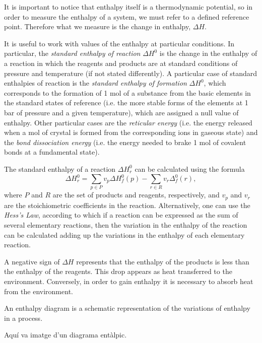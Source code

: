 \documentclass[a4paper,10pt]{article}
\theoremstyle{plain}
\theoremstyle{definition}
\theoremstyle{remark}
\begin{document}
It is important to notice that enthalpy itself is a thermodynamic potential, so in order to measure the enthalpy of a system, we must refer to a defined reference point. Therefore what we measure is the change in enthalpy, $\Delta H$.

It is useful to work with values of the enthalpy at particular conditions. In particular, the \textit{standard enthalpy of reaction} $\Delta H^0$ is the change in the enthalpy of a reaction in which the reagents and products are at standard conditions of pressure and temperature (if not stated differently). A particular case of standard enthalpies of reaction is the \textit{standard enthalpy of formation} $\Delta H^0$, which corresponds to the formation of 1 mol of a substance from the basic elements in the standard states of reference (i.e. the more stable forms of the elements at 1 bar of pressure and a given temperature), which are assigned a null value of enthalpy. Other particular cases are the \textit{reticular energy} (i.e. the energy released when a mol of crystal is formed from the corresponding ions in gaseous state) and the \textit{bond dissociation energy} (i.e. the energy needed to brake 1 mol of covalent bonds at a fundamental state).

The standard enthalpy of a reaction $\Delta H_r^0$ can be calculated using the formula
\begin{equation}
\Delta H_r^0=\sum_{p\in P}v_p\Delta H_f^0(p) - \sum_{r\in R} v_r\Delta_f^0(r),
\end{equation}
where $P$ and $R$ are the set of products and reagents, respectively, and $v_p$ and $v_r$ are the stoichiometric coefficients in the reaction. Alternatively, one can use the \textit{Hess's Law}, according to which if a reaction can be expressed as the sum of several elementary reactions, then the variation in the enthalpy of the reaction can be calculated adding up the variations in the enthalpy of each elementary reaction.

A negative sign of $\Delta H$ represents that the enthalpy of the products is less than the enthalpy of the reagents. This drop appears as heat transferred to the environment. Conversely, in order to gain enthalpy it is necessary to absorb heat from the environment.

An enthalpy diagram is a schematic representation of the variations of enthalpy in a process.

{\color{red}Aquí va imatge d'un diagrama entàlpic.}
\end{document}
